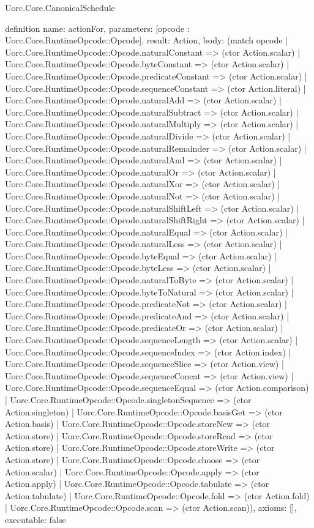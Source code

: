 \begin{lexlean}{Uorc.Core.CanonicalSchedule}
\begin{semanticmodule}
definition{
  name: actionFor,
  parameters: [opcode : Uorc.Core.RuntimeOpcode::Opcode],
  result: Action,
  body: (match opcode
    | Uorc.Core.RuntimeOpcode::Opcode.naturalConstant => (ctor Action.scalar)
    | Uorc.Core.RuntimeOpcode::Opcode.byteConstant => (ctor Action.scalar)
    | Uorc.Core.RuntimeOpcode::Opcode.predicateConstant => (ctor Action.scalar)
    | Uorc.Core.RuntimeOpcode::Opcode.sequenceConstant => (ctor Action.literal)
    | Uorc.Core.RuntimeOpcode::Opcode.naturalAdd => (ctor Action.scalar)
    | Uorc.Core.RuntimeOpcode::Opcode.naturalSubtract => (ctor Action.scalar)
    | Uorc.Core.RuntimeOpcode::Opcode.naturalMultiply => (ctor Action.scalar)
    | Uorc.Core.RuntimeOpcode::Opcode.naturalDivide => (ctor Action.scalar)
    | Uorc.Core.RuntimeOpcode::Opcode.naturalRemainder => (ctor Action.scalar)
    | Uorc.Core.RuntimeOpcode::Opcode.naturalAnd => (ctor Action.scalar)
    | Uorc.Core.RuntimeOpcode::Opcode.naturalOr => (ctor Action.scalar)
    | Uorc.Core.RuntimeOpcode::Opcode.naturalXor => (ctor Action.scalar)
    | Uorc.Core.RuntimeOpcode::Opcode.naturalNot => (ctor Action.scalar)
    | Uorc.Core.RuntimeOpcode::Opcode.naturalShiftLeft => (ctor Action.scalar)
    | Uorc.Core.RuntimeOpcode::Opcode.naturalShiftRight => (ctor Action.scalar)
    | Uorc.Core.RuntimeOpcode::Opcode.naturalEqual => (ctor Action.scalar)
    | Uorc.Core.RuntimeOpcode::Opcode.naturalLess => (ctor Action.scalar)
    | Uorc.Core.RuntimeOpcode::Opcode.byteEqual => (ctor Action.scalar)
    | Uorc.Core.RuntimeOpcode::Opcode.byteLess => (ctor Action.scalar)
    | Uorc.Core.RuntimeOpcode::Opcode.naturalToByte => (ctor Action.scalar)
    | Uorc.Core.RuntimeOpcode::Opcode.byteToNatural => (ctor Action.scalar)
    | Uorc.Core.RuntimeOpcode::Opcode.predicateNot => (ctor Action.scalar)
    | Uorc.Core.RuntimeOpcode::Opcode.predicateAnd => (ctor Action.scalar)
    | Uorc.Core.RuntimeOpcode::Opcode.predicateOr => (ctor Action.scalar)
    | Uorc.Core.RuntimeOpcode::Opcode.sequenceLength => (ctor Action.scalar)
    | Uorc.Core.RuntimeOpcode::Opcode.sequenceIndex => (ctor Action.index)
    | Uorc.Core.RuntimeOpcode::Opcode.sequenceSlice => (ctor Action.view)
    | Uorc.Core.RuntimeOpcode::Opcode.sequenceConcat => (ctor Action.view)
    | Uorc.Core.RuntimeOpcode::Opcode.sequenceEqual => (ctor Action.comparison)
    | Uorc.Core.RuntimeOpcode::Opcode.singletonSequence => (ctor Action.singleton)
    | Uorc.Core.RuntimeOpcode::Opcode.basisGet => (ctor Action.basis)
    | Uorc.Core.RuntimeOpcode::Opcode.storeNew => (ctor Action.store)
    | Uorc.Core.RuntimeOpcode::Opcode.storeRead => (ctor Action.store)
    | Uorc.Core.RuntimeOpcode::Opcode.storeWrite => (ctor Action.store)
    | Uorc.Core.RuntimeOpcode::Opcode.choose => (ctor Action.scalar)
    | Uorc.Core.RuntimeOpcode::Opcode.apply => (ctor Action.apply)
    | Uorc.Core.RuntimeOpcode::Opcode.tabulate => (ctor Action.tabulate)
    | Uorc.Core.RuntimeOpcode::Opcode.fold => (ctor Action.fold)
    | Uorc.Core.RuntimeOpcode::Opcode.scan => (ctor Action.scan)),
  axioms: [],
  executable: false
}


\end{semanticmodule}
\end{lexlean}
